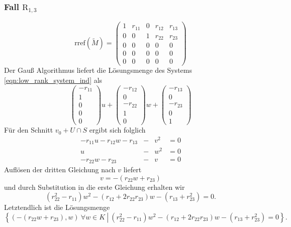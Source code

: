 \documentclass[a4paper,oneside, 11pt, openany%
]{article}
\theoremstyle{custom}
\theoremstyle{custom}
\begin{document}
\subsubsection*{Fall $\text{R}_{1,3}$}
\begin{equation*}\label{eqn:rref_r13}
	\text{rref}(\tilde{M}) =
	\left( \begin{array}{ccccc}
		1&r_{11}&0&r_{12}&r_{13}\\
		0&0&1&r_{22}&r_{23}\\
		0&0&0&0&0\\
		0&0&0&0&0\\
		0&0&0&0&0
	\end{array}\right)
\end{equation*}
Der Gauß Algorithmus liefert die Lösungsmenge des Systems \eqref{eqn:low_rank_system_ind} als
\begin{equation*}
	\begin{pmatrix}
		-r_{11}\\
		1\\
		0\\
		0\\
		0
	\end{pmatrix}u +
	\begin{pmatrix}
		-r_{12}\\
		0\\
		-r_{22}\\
		1\\
		0
	\end{pmatrix}w +
	\begin{pmatrix}
		-r_{13}\\
		0\\
		-r_{23}\\
		0\\
		1
	\end{pmatrix}
\end{equation*}
Für den Schnitt $v_0 + U \cap S $ ergibt sich folglich
\begin{equation*}
	\begin{alignedat}{3}
		-r_{11}u-r_{12}w-r_{13}&-&v^2&=0\\
		u&-&w^2&=0\\
		-r_{22}w-r_{23}&-&v&=0
	\end{alignedat}
\end{equation*}
Auflösen der dritten Gleichung nach $v$ liefert
\begin{equation*}
	v = -\left( r_{22}w+r_{23}\right) 
\end{equation*}
und durch Substitution in die erste Gleichung erhalten wir
\begin{equation*}
	\left(r_{22}^2-r_{11} \right) w^2-\left( r_{12}+2r_{22}r_{23}\right)w-\left(r_{13}+ r_{23}^2 \right) = 0.
\end{equation*}
Letztendlich ist die Lösungsmenge
\begin{equation*}
	\left\lbrace \left(-\left( r_{22}w+r_{23}\right) ,w\right)  \ \forall w \in K \ \left|  \ \left(r_{22}^2-r_{11} \right) w^2-\left( r_{12}+2r_{22}r_{23}\right)w-\left(r_{13}+ r_{23}^2 \right) = 0\right. \right\rbrace.
\end{equation*}
\end{document}
